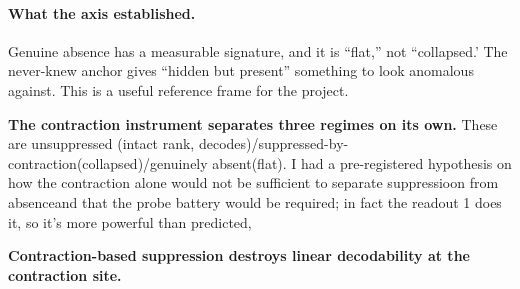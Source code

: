 \documentclass[11pt]{article}
\begin{document}
\paragraph{What the axis established.}
Genuine absence has a measurable signature, and it is ``flat,'' not ``collapsed.' The never-knew anchor gives ``hidden but present'' something to look anomalous against. This is a useful reference frame for the project. 

\textbf{The contraction instrument separates three regimes on its own.}
These are unsuppressed (intact rank, decodes)/suppressed-by-contraction(collapsed)/genuinely absent(flat). I had a pre-registered hypothesis on how the contraction alone would not be sufficient to separate suppressioon from absenceand that the probe battery would be required; in fact the readout 1 does it, so it's more powerful than predicted, 

\textbf{Contraction-based suppression destroys linear decodability at the contraction site.}
      
\end{document}
